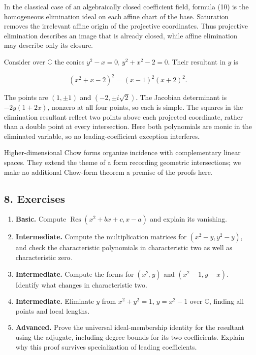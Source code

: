 \documentclass[
]{article}
\providecommand{\tightlist}{%
  \setlength{\itemsep}{0pt}\setlength{\parskip}{0pt}}
\begin{document}
In the classical case of an algebraically closed coefficient field,
formula (10) is the homogeneous elimination ideal on each affine chart
of the base. Saturation removes the irrelevant affine origin of the
projective coordinates. Thus projective elimination describes an image
that is already closed, while affine elimination may describe only its
closure.

Consider over \(\mathbb C\) the conics \(y^2-x=0\), \(y^2+x^2-2=0\).
Their resultant in \(y\) is

\[
(x^2+x-2)^2=(x-1)^2(x+2)^2.
\]

The points are \((1,\pm1)\) and \((-2,\pm i\sqrt2)\). The Jacobian
determinant is \(-2y(1+2x)\), nonzero at all four points, so each is
simple. The squares in the elimination resultant reflect two points
above each projected coordinate, rather than a double point at every
intersection. Here both polynomials are monic in the eliminated
variable, so no leading-coefficient exception interferes.

Higher-dimensional Chow forms organize incidence with complementary
linear spaces. They extend the theme of a form recording geometric
intersections; we make no additional Chow-form theorem a premise of the
proofs here.

\subsection{8. Exercises}\label{exercises}

\begin{enumerate}
\def\labelenumi{\arabic{enumi}.}
\tightlist
\item
  \textbf{Basic.} Compute \(\operatorname{Res}(x^2+bx+c,x-a)\) and
  explain its vanishing.
\item
  \textbf{Intermediate.} Compute the multiplication matrices for
  \((x^2-y,y^2-y)\), and check the characteristic polynomials in
  characteristic two as well as characteristic zero.
\item
  \textbf{Intermediate.} Compute the forms for \((x^2,y)\) and
  \((x^2-1,y-x)\). Identify what changes in characteristic two.
\item
  \textbf{Intermediate.} Eliminate \(y\) from \(x^2+y^2=1\), \(y=x^2-1\)
  over \(\mathbb C\), finding all points and local lengths.
\item
  \textbf{Advanced.} Prove the universal ideal-membership identity for
  the resultant using the adjugate, including degree bounds for its two
  coefficients. Explain why this proof survives specialization of
  leading coefficients.
\end{enumerate}
\end{document}
